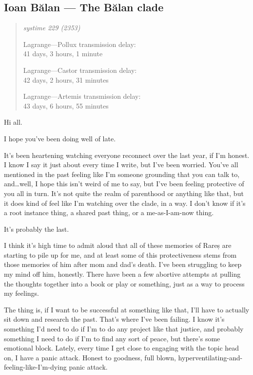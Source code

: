 \hypertarget{ioan-bux103lan-the-bux103lan-clade}{%
\subsection{Ioan Bălan — The Bălan clade}\label{ioan-bux103lan-the-bux103lan-clade}}

\begin{quote}
\itshape
systime 229 (2353)

Lagrange---Pollux transmission delay:\\
41 days, 3 hours, 1 minute

Lagrange---Castor transmission delay:\\
42 days, 2 hours, 31 minutes

Lagrange---Artemis transmission delay:\\
43 days, 6 hours, 55 minutes
\end{quote}

Hi all.

I hope you've been doing well of late.

It's been heartening watching everyone reconnect over the last year, if I'm honest. I know I say it just about every time I write, but I've been worried. You've all mentioned in the past feeling like I'm someone grounding that you can talk to, and\ldots well, I hope this isn't weird of me to say, but I've been feeling protective of you all in turn. It's not quite the realm of parenthood or anything like that, but it does kind of feel like I'm watching over the clade, in a way. I don't know if it's a root instance thing, a shared past thing, or a me-as-I-am-now thing.

It's probably the last.

I think it's high time to admit aloud that all of these memories of Rareș are starting to pile up for me, and at least some of this protectiveness stems from those memories of him after mom and dad's death. I've been struggling to keep my mind off him, honestly. There have been a few abortive attempts at pulling the thoughts together into a book or play or something, just as a way to process my feelings.

The thing is, if I want to be successful at something like that, I'll have to actually sit down and research the past. That's where I've been failing. I know it's something I'd need to do if I'm to do any project like that justice, and probably something I need to do if I'm to find any sort of peace, but there's some emotional block. Lately, every time I get close to engaging with the topic head on, I have a panic attack. Honest to goodness, full blown, hyperventilating-and-feeling-like-I'm-dying panic attack.

